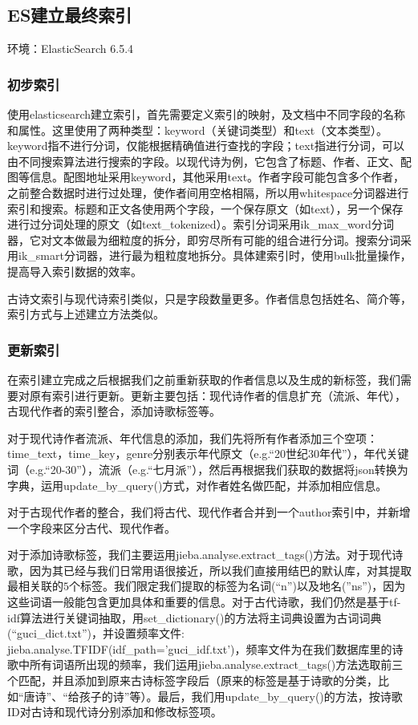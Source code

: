 \documentclass[a4paper, 10pt]{article}
\begin{document}
\subsection{ES建立最终索引}
环境：ElasticSearch 6.5.4

\subsubsection{初步索引}
使用elasticsearch建立索引，首先需要定义索引的映射，及文档中不同字段的名称和属性。这里使用了两种类型：keyword（关键词类型）和text（文本类型）。keyword指不进行分词，仅能根据精确值进行查找的字段；text指进行分词，可以由不同搜索算法进行搜索的字段。以现代诗为例，它包含了标题、作者、正文、配图等信息。配图地址采用keyword，其他采用text。作者字段可能包含多个作者，之前整合数据时进行过处理，使作者间用空格相隔，所以用whitespace分词器进行索引和搜索。标题和正文各使用两个字段，一个保存原文（如text），另一个保存进行过分词处理的原文（如text\_tokenized）。索引分词采用ik\_max\_word分词器，它对文本做最为细粒度的拆分，即穷尽所有可能的组合进行分词。搜索分词采用ik\_smart分词器，进行最为粗粒度地拆分。具体建索引时，使用bulk批量操作，提高导入索引数据的效率。

古诗文索引与现代诗索引类似，只是字段数量更多。作者信息包括姓名、简介等，索引方式与上述建立方法类似。

\subsubsection{更新索引}
在索引建立完成之后根据我们之前重新获取的作者信息以及生成的新标签，我们需要对原有索引进行更新。更新主要包括：现代诗作者的信息扩充（流派、年代），古现代作者的索引整合，添加诗歌标签等。

对于现代诗作者流派、年代信息的添加，我们先将所有作者添加三个空项：time\_text，time\_key，genre分别表示年代原文（e.g.“20世纪30年代”），年代关键词（e.g.“20-30”），流派（e.g.“七月派”），然后再根据我们获取的数据将json转换为字典，运用update\_by\_query()方式，对作者姓名做匹配，并添加相应信息。

对于古现代作者的整合，我们将古代、现代作者合并到一个author索引中，并新增一个字段来区分古代、现代作者。

对于添加诗歌标签，我们主要运用jieba.analyse.extract\_tags()方法。对于现代诗歌，因为其已经与我们日常用语很接近，所以我们直接用结巴的默认库，对其提取最相关联的$5$个标签。我们限定我们提取的标签为名词(“n”)以及地名(”ns”)，因为这些词语一般能包含更加具体和重要的信息。对于古代诗歌，我们仍然是基于tf-idf算法进行关键词抽取，用set\_dictionary()的方法将主词典设置为古词词典(“guci\_dict.txt”)，并设置频率文件: jieba.analyse.TFIDF(idf\_path='guci\_idf.txt')，频率文件为在我们数据库里的诗歌中所有词语所出现的频率，我们运用jieba.analyse.extract\_tags()方法选取前三个匹配，并且添加到原来古诗标签字段后（原来的标签是基于诗歌的分类，比如“唐诗”、“给孩子的诗”等）。最后，我们用update\_by\_query()的方法，按诗歌ID对古诗和现代诗分别添加和修改标签项。
\end{document}
